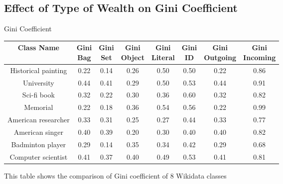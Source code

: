 \subsection{Effect of Type of Wealth on Gini Coefficient}

% 
% 
% 

\begin{center}
    \small
    \begin{threeparttable}
    \caption{Gini Coefficient}
    \label{tab:gini bag-set}
    \begin{tabular}{c c c | c c  c | c c } 
    
    \toprule
        Class Name & \CellWithForceBreak{Gini \\ Bag} & \CellWithForceBreak{Gini \\ Set} & \CellWithForceBreak{Gini \\ Object} & \CellWithForceBreak{Gini \\ Literal} & \CellWithForceBreak{Gini \\ ID} & \CellWithForceBreak{Gini \\ Outgoing} & \CellWithForceBreak{Gini \\ Incoming} \\ [0.5ex] 
    \midrule
        Historical painting & 0.22 & 0.14 & 0.26 & 0.50 & 0.50 & 0.22 & 0.86 \\
        University & 0.44 & 0.41 & 0.29 & 0.50 & 0.53 & 0.44 & 0.91 \\
        Sci-fi book & 0.32 & 0.22 & 0.30 & 0.36 & 0.60 & 0.32 & 0.82 \\
        Memorial & 0.22 & 0.18 & 0.36 & 0.54 & 0.56 & 0.22 & 0.99 \\
        American researcher & 0.33 & 0.31 & 0.25 & 0.27 & 0.44 & 0.33 & 0.77 \\
        American singer & 0.40 & 0.39 & 0.20 & 0.30 & 0.40 & 0.40 & 0.82 \\
        Badminton player & 0.29 & 0.14 & 0.35 & 0.34 & 0.42 & 0.29 & 0.68 \\
        Computer scientist & 0.41 & 0.37 & 0.40 & 0.49 & 0.53 & 0.41 & 0.81 \\
        [1ex]
    \bottomrule
    \end{tabular}
    \begin{tablenotes}
        \footnotesize
        This table shows the comparison of Gini coefficient of 8 Wikidata classes
    \end{tablenotes}
    \end{threeparttable}
\end{center}